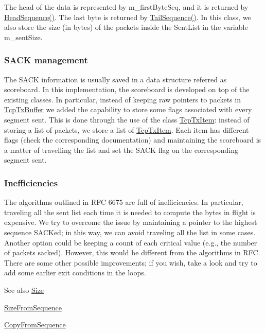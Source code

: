 The head of the data is represented by m\+\_\+first\+Byte\+Seq, and it is returned by \hyperlink{classns3_1_1TcpTxBuffer_a6c7cdcf53b722f2877372bd75a1541a7}{Head\+Sequence()}. The last byte is returned by \hyperlink{classns3_1_1TcpTxBuffer_a1c2dbb57cd4581054e57ee8ae0cbfb06}{Tail\+Sequence()}. In this class, we also store the size (in bytes) of the packets inside the Sent\+List in the variable m\+\_\+sent\+Size.

\subsubsection*{S\+A\+CK management }

The S\+A\+CK information is usually saved in a data structure referred as scoreboard. In this implementation, the scoreboard is developed on top of the existing classes. In particular, instead of keeping raw pointers to packets in \hyperlink{classns3_1_1TcpTxBuffer}{Tcp\+Tx\+Buffer} we added the capability to store some flags associated with every segment sent. This is done through the use of the class \hyperlink{classns3_1_1TcpTxItem}{Tcp\+Tx\+Item}\+: instead of storing a list of packets, we store a list of \hyperlink{classns3_1_1TcpTxItem}{Tcp\+Tx\+Item}. Each item has different flags (check the corresponding documentation) and maintaining the scoreboard is a matter of travelling the list and set the S\+A\+CK flag on the corresponding segment sent.

\subsubsection*{Inefficiencies }

The algorithms outlined in R\+FC 6675 are full of inefficiencies. In particular, traveling all the sent list each time it is needed to compute the bytes in flight is expensive. We try to overcome the issue by maintaining a pointer to the highest sequence S\+A\+C\+Ked; in this way, we can avoid traveling all the list in some cases. Another option could be keeping a count of each critical value (e.\+g., the number of packets sacked). However, this would be different from the algorithms in R\+FC. There are some other possible improvements; if you wish, take a look and try to add some earlier exit conditions in the loops.

\begin{DoxySeeAlso}{See also}
\hyperlink{classns3_1_1TcpTxBuffer_a24621b9d6f583bbbe4567b239901176b}{Size} 

\hyperlink{classns3_1_1TcpTxBuffer_a6e44c34fdb2c14dcc11dbbe86d8b328a}{Size\+From\+Sequence} 

\hyperlink{classns3_1_1TcpTxBuffer_a5eb9c889cfad2cd11a5ccf996c506fd3}{Copy\+From\+Sequence} 
\end{DoxySeeAlso}


